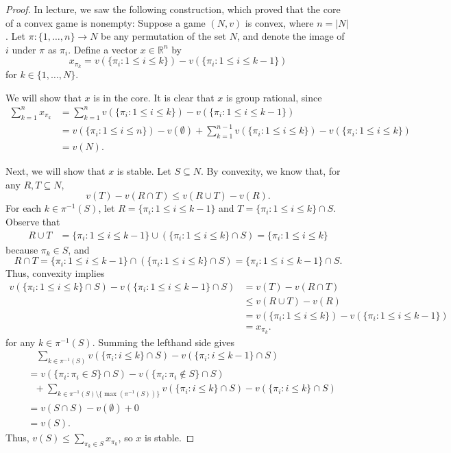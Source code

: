 \documentclass[10pt]{article}
\newcommand{\R}{\mathbb{R}}
\begin{document}
\begin{enumerate}
\begin{proof}
In lecture, we saw the following construction, which proved that the core of a convex game is nonempty:
Suppose a game $(N,v)$ is convex, where $n = |N|$.  Let $\pi: \{1, \dots , n\} \rightarrow N$ be any permutation of the set $N$, and denote the image of $i$ under $\pi$ as $\pi_i$.  Define a vector $x \in \R^n$ by $$x_{\pi_k} = v(\{\pi_i: 1 \leq i \leq k\}) - v(\{\pi_i: 1 \leq i \leq k-1\})$$ for $k \in \{1, \dots , N\}$.

We will show that $x$ is in the core.  It is clear that $x$ is group rational, since
\begin{align*}
\sum_{k = 1}^n x_{\pi_k} &= \sum_{k = 1}^n v(\{\pi_i: 1 \leq i \leq k\}) - v(\{\pi_i: 1 \leq i \leq k-1\})
\\
&= v(\{\pi_i: 1 \leq i \leq n\}) - v(\emptyset) + \sum_{k=1}^{n-1} v(\{\pi_i: 1 \leq i \leq k\}) - v(\{\pi_i: 1 \leq i \leq k\})
\\
&= v(N).
\end{align*}

Next, we will show that $x$ is stable.  Let $S \subseteq N$.  By convexity, we know that, for any $R, T \subseteq N$,
$$
v(T) - v(R \cap T) \leq v(R \cup T) - v(R).
$$
For each $k \in \pi^{-1}(S)$, let $R = \{\pi_i : 1 \leq i \leq k-1\}$ and $T = \{\pi_i : 1 \leq i \leq k\} \cap S$.  Observe that 
\begin{align*}
R \cup T &= \{\pi_i : 1 \leq i \leq k-1\} \cup (\{\pi_i : 1 \leq i \leq k\} \cap S)
= \{\pi_i : 1 \leq i \leq k\}
\end{align*}
because $\pi_k \in S$, and
$$
R \cap T = \{\pi_i : 1 \leq i \leq k-1\} \cap (\{\pi_i : 1 \leq i \leq k\} \cap S) = \{\pi_i : 1 \leq i \leq k-1\} \cap S.
$$
Thus, convexity implies
\begin{align*}
v(\{\pi_i : 1 \leq i \leq k\} \cap S) - v(\{\pi_i : 1 \leq i \leq k-1\} \cap S)
&= v(T) - v(R \cap T)
\\
&\leq
v(R \cup T) - v(R)
\\
&= v(\{\pi_i : 1 \leq i \leq k\}) - v(\{\pi_i : 1 \leq i \leq k-1\})
\\
&= x_{\pi_k}.
\end{align*}
for any $k \in \pi^{-1}(S)$.  Summing the lefthand side gives
\begin{align*}
& \ \ \ \ \sum_{k \in \pi^{-1}(S)} v(\{\pi_i : i \leq k\} \cap S) - v(\{\pi_i : i \leq k-1\} \cap S)
\\
&=
v(\{\pi_i : \pi_i \in S\} \cap S) - v(\{\pi_i : \pi_i \not \in S\} \cap S)
\\
& \ \ \ + \sum_{k \in \pi^{-1}(S) \setminus \{ \max(\pi^{-1}(S)) \}} v(\{\pi_i : i \leq k\} \cap S) - v(\{\pi_i : i \leq k\} \cap S)
\\
&= v(S \cap S) - v(\emptyset) + 0
\\
&= v(S).
\end{align*}
Thus, $v(S) \leq \sum\limits_{\pi_k \in S} x_{\pi_k}$, so $x$ is stable.


\end{proof}
\end{enumerate}
\end{document}
